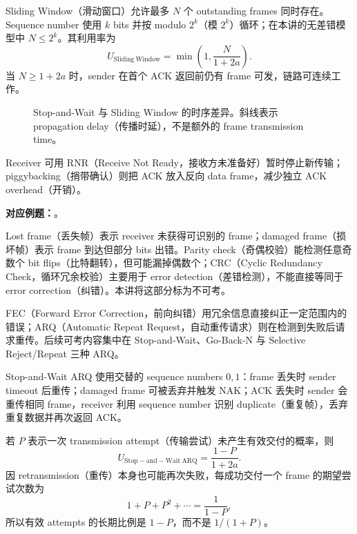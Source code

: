 Sliding Window（滑动窗口）允许最多 $N$ 个 outstanding frames 同时存在。Sequence number 使用 $k$ bits 并按 modulo $2^k$（模 $2^k$）循环；在本讲的无差错模型中 $N\leq 2^k$。其利用率为
\[
  \boxed{U_{\mathrm{Sliding\ Window}}
    =\min\!\left(1,\frac{N}{1+2a}\right)}.
\]
当 $N\geq 1+2a$ 时，sender 在首个 ACK 返回前仍有 frame 可发，链路可连续工作。

\begin{figure}[htbp]
  \centering
  \resizebox{0.96\textwidth}{!}{}
  \caption{Stop-and-Wait 与 Sliding Window 的时序差异。斜线表示 propagation delay（传播时延），不是额外的 frame transmission time。}
  \label{fig:sc2008-l02-flow-timing}
\end{figure}

Receiver 可用 RNR（Receive Not Ready，接收方未准备好）暂时停止新传输；piggybacking（捎带确认）则把 ACK 放入反向 data frame，减少独立 ACK overhead（开销）。

\textbf{对应例题：}。


Lost frame（丢失帧）表示 receiver 未获得可识别的 frame；damaged frame（损坏帧）表示 frame 到达但部分 bits 出错。Parity check（奇偶校验）能检测任意奇数个 bit flips（比特翻转），但可能漏掉偶数个；CRC（Cyclic Redundancy Check，循环冗余校验）主要用于 error detection（差错检测），不能直接等同于 error correction（纠错）。本讲将这部分标为不可考。

FEC（Forward Error Correction，前向纠错）用冗余信息直接纠正一定范围内的错误；ARQ（Automatic Repeat Request，自动重传请求）则在检测到失败后请求重传。后续可考内容集中在 Stop-and-Wait、Go-Back-N 与 Selective Reject/Repeat 三种 ARQ。


Stop-and-Wait ARQ 使用交替的 sequence numbers $0,1$：frame 丢失时 sender timeout 后重传；damaged frame 可被丢弃并触发 NAK；ACK 丢失时 sender 会重传相同 frame，receiver 利用 sequence number 识别 duplicate（重复帧），丢弃重复数据并再次返回 ACK。

若 $P$ 表示一次 transmission attempt（传输尝试）未产生有效交付的概率，则
\[
  \boxed{U_{\mathrm{Stop-and-Wait\ ARQ}}
    =\frac{1-P}{1+2a}}.
\]
因 retransmission（重传）本身也可能再次失败，每成功交付一个 frame 的期望尝试次数为
\[
  1+P+P^2+\cdots=\frac{1}{1-P},
\]
所以有效 attempts 的长期比例是 $1-P$，而不是 $1/(1+P)$。

